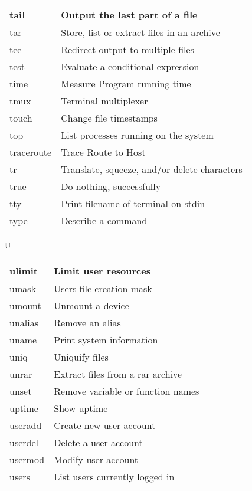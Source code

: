 \begin{flushleft}
\begin{tabular}{lp{12cm}}
	\hline
 	tail &	Output the last part of a file \\
 	\hline
	tar &	Store, list or extract files in an archive \\
	\hline
	tee &	Redirect output to multiple files \\
	\hline
	test &	Evaluate a conditional expression \\
	\hline
	time &	Measure Program running time \\
	\hline
	tmux &	Terminal multiplexer \\
	\hline
	touch &	Change file timestamps \\
	\hline
	top &	List processes running on the system \\
	\hline
	traceroute & Trace Route to Host \\
	\hline
	tr	& Translate, squeeze, and/or delete characters \\
	\hline
	true &	Do nothing, successfully \\
	\hline
	tty  &	Print filename of terminal on stdin \\
	\hline
	type &	Describe a command \\
	\hline
\end{tabular}

\newpage

\begin{tcolorbox}
	\textsc{U}
\end{tcolorbox}

\begin{tabular}{lp{12cm}}
	\hline
 	ulimit &	Limit user resources \\
 	\hline
	umask &	Users file creation mask \\
	\hline
	umount &	Unmount a device \\
	\hline
	unalias &	Remove an alias \\
	\hline
	uname &	Print system information \\
	\hline
	uniq &	Uniquify files \\
	\hline
	unrar &	Extract files from a rar archive \\
	\hline
	unset & 	Remove variable or function names \\
	\hline
	uptime &	Show uptime \\
	\hline
	useradd &	Create new user account \\
	\hline
	userdel &	Delete a user account \\
	\hline
	usermod &	Modify user account \\
	\hline
	users &	List users currently logged in \\
	\hline
\end{tabular}



\end{flushleft}
